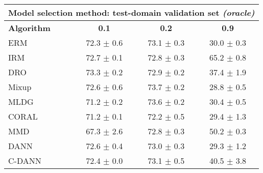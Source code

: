 \documentclass{article}
\begin{document}
\begin{center}
\begin{tabular}{lccc}
\toprule
\multicolumn{4}{c}{\textbf{Model selection method: test-domain validation set \textit{(oracle)}}} \\
\midrule
\textbf{Algorithm}    & \textbf{0.1}              & \textbf{0.2}              & \textbf{0.9}              \\
\midrule
ERM                       & 72.3 $\pm$ 0.6            & 73.1 $\pm$ 0.3            & 30.0 $\pm$ 0.3            \\
IRM                       & 72.7 $\pm$ 0.1            & 72.8 $\pm$ 0.3            & 65.2 $\pm$ 0.8            \\
DRO                 & 73.3 $\pm$ 0.2            & 72.9 $\pm$ 0.2            & 37.4 $\pm$ 1.9            \\
Mixup                     & 72.6 $\pm$ 0.6            & 73.7 $\pm$ 0.2            & 28.8 $\pm$ 0.5            \\
MLDG                      & 71.2 $\pm$ 0.2            & 73.6 $\pm$ 0.2            & 30.4 $\pm$ 0.5            \\
CORAL                     & 71.2 $\pm$ 0.1            & 72.2 $\pm$ 0.5            & 29.4 $\pm$ 1.3            \\
MMD                       & 67.3 $\pm$ 2.6            & 72.8 $\pm$ 0.3            & 50.2 $\pm$ 0.3            \\
DANN                       & 72.6 $\pm$ 0.4            & 73.0 $\pm$ 0.3            & 29.3 $\pm$ 1.2            \\
C-DANN                   & 72.4 $\pm$ 0.0            & 73.1 $\pm$ 0.5            & 40.5 $\pm$ 3.8            \\
\bottomrule
\end{tabular}
\end{center}

\clearpage
\newpage
\end{document}
